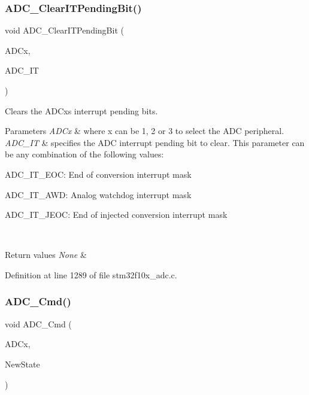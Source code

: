 \subsubsection{\texorpdfstring{A\+D\+C\+\_\+\+Clear\+I\+T\+Pending\+Bit()}{ADC\_ClearITPendingBit()}}
{\footnotesize\ttfamily void A\+D\+C\+\_\+\+Clear\+I\+T\+Pending\+Bit (\begin{DoxyParamCaption}\item[{\hyperlink{struct_a_d_c___type_def}{A\+D\+C\+\_\+\+Type\+Def} $\ast$}]{A\+D\+Cx,  }\item[{uint16\+\_\+t}]{A\+D\+C\+\_\+\+IT }\end{DoxyParamCaption})}



Clears the A\+D\+Cx\textquotesingle{}s interrupt pending bits. 


\begin{DoxyParams}{Parameters}
{\em A\+D\+Cx} & where x can be 1, 2 or 3 to select the A\+DC peripheral. \\
\hline
{\em A\+D\+C\+\_\+\+IT} & specifies the A\+DC interrupt pending bit to clear. This parameter can be any combination of the following values\+: \begin{DoxyItemize}
\item A\+D\+C\+\_\+\+I\+T\+\_\+\+E\+OC\+: End of conversion interrupt mask \item A\+D\+C\+\_\+\+I\+T\+\_\+\+A\+WD\+: Analog watchdog interrupt mask \item A\+D\+C\+\_\+\+I\+T\+\_\+\+J\+E\+OC\+: End of injected conversion interrupt mask \end{DoxyItemize}
\\
\hline
\end{DoxyParams}

\begin{DoxyRetVals}{Return values}
{\em None} & \\
\hline
\end{DoxyRetVals}


Definition at line 1289 of file stm32f10x\+\_\+adc.\+c.

\mbox{\label{group___a_d_c___exported___functions_ga40882d399e3371755ed610c1134e634e}} 
\subsubsection{\texorpdfstring{A\+D\+C\+\_\+\+Cmd()}{ADC\_Cmd()}}
{\footnotesize\ttfamily void A\+D\+C\+\_\+\+Cmd (\begin{DoxyParamCaption}\item[{\hyperlink{struct_a_d_c___type_def}{A\+D\+C\+\_\+\+Type\+Def} $\ast$}]{A\+D\+Cx,  }\item[{\hyperlink{group___exported__types_gac9a7e9a35d2513ec15c3b537aaa4fba1}{Functional\+State}}]{New\+State }\end{DoxyParamCaption})}




